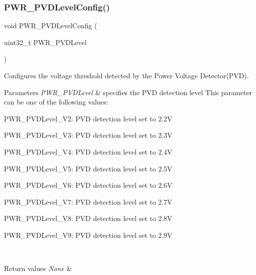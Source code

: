 \subsubsection{\texorpdfstring{PWR\_PVDLevelConfig()}{PWR\_PVDLevelConfig()}}
{\footnotesize\ttfamily void P\+W\+R\+\_\+\+P\+V\+D\+Level\+Config (\begin{DoxyParamCaption}\item[{uint32\+\_\+t}]{P\+W\+R\+\_\+\+P\+V\+D\+Level }\end{DoxyParamCaption})}



Configures the voltage threshold detected by the Power Voltage Detector(\+P\+V\+D). 


\begin{DoxyParams}{Parameters}
{\em P\+W\+R\+\_\+\+P\+V\+D\+Level} & specifies the P\+VD detection level This parameter can be one of the following values\+: \begin{DoxyItemize}
\item P\+W\+R\+\_\+\+P\+V\+D\+Level\+\_\+V2\+: P\+VD detection level set to 2.\+2V \item P\+W\+R\+\_\+\+P\+V\+D\+Level\+\_\+V3\+: P\+VD detection level set to 2.\+3V \item P\+W\+R\+\_\+\+P\+V\+D\+Level\+\_\+V4\+: P\+VD detection level set to 2.\+4V \item P\+W\+R\+\_\+\+P\+V\+D\+Level\+\_\+V5\+: P\+VD detection level set to 2.\+5V \item P\+W\+R\+\_\+\+P\+V\+D\+Level\+\_\+V6\+: P\+VD detection level set to 2.\+6V \item P\+W\+R\+\_\+\+P\+V\+D\+Level\+\_\+V7\+: P\+VD detection level set to 2.\+7V \item P\+W\+R\+\_\+\+P\+V\+D\+Level\+\_\+V8\+: P\+VD detection level set to 2.\+8V \item P\+W\+R\+\_\+\+P\+V\+D\+Level\+\_\+V9\+: P\+VD detection level set to 2.\+9V \end{DoxyItemize}
\\
\hline
\end{DoxyParams}

\begin{DoxyRetVals}{Return values}
{\em None} & \\
\hline
\end{DoxyRetVals}
\mbox{\label{group___p_w_r___private___functions_gae5fd6f9336ef8c60d5483651cb0d1a00}} 
